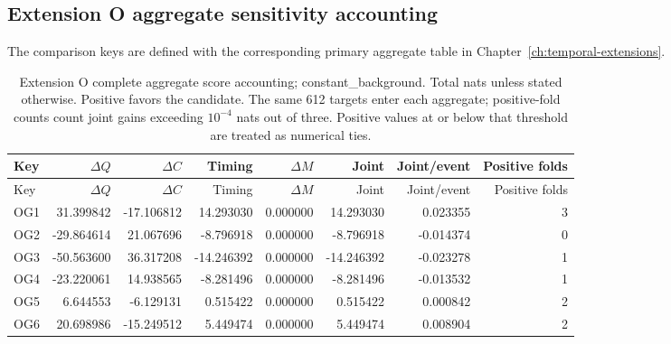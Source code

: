 \subsection{Extension O aggregate sensitivity accounting}
\label{app:audit09-extension-o-sensitivity}
The comparison keys are defined with the corresponding primary aggregate table in Chapter~\ref{ch:temporal-extensions}.

{\small
\setlength{\tabcolsep}{3pt}
\begin{longtable}{lrrrrrrr}
\caption{Extension O complete aggregate score accounting; constant\_background. Total nats unless stated otherwise. Positive favors the candidate. The same 612 targets enter each aggregate; positive-fold counts count joint gains exceeding $10^{-4}$ nats out of three. Positive values at or below that threshold are treated as numerical ties.}\label{tab:OG-constant_background}\\
\toprule
Key & $\Delta Q$ & $\Delta C$ & Timing & $\Delta M$ & Joint & Joint/event & Positive folds\\\midrule
\endfirsthead
\toprule
Key & $\Delta Q$ & $\Delta C$ & Timing & $\Delta M$ & Joint & Joint/event & Positive folds\\\midrule
\endhead
OG1 & 31.399842 & -17.106812 & 14.293030 & 0.000000 & 14.293030 & 0.023355 & 3\\
OG2 & -29.864614 & 21.067696 & -8.796918 & 0.000000 & -8.796918 & -0.014374 & 0\\
OG3 & -50.563600 & 36.317208 & -14.246392 & 0.000000 & -14.246392 & -0.023278 & 1\\
OG4 & -23.220061 & 14.938565 & -8.281496 & 0.000000 & -8.281496 & -0.013532 & 1\\
OG5 & 6.644553 & -6.129131 & 0.515422 & 0.000000 & 0.515422 & 0.000842 & 2\\
OG6 & 20.698986 & -15.249512 & 5.449474 & 0.000000 & 5.449474 & 0.008904 & 2\\
\bottomrule
\end{longtable}
}

